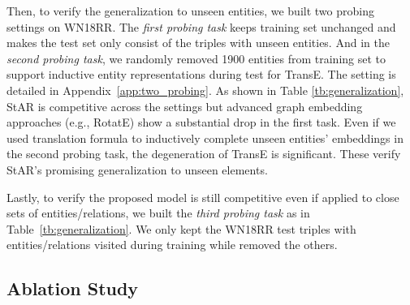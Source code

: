 \documentclass[sigconf]{acmart}
\begin{document}
Then, to verify the generalization to unseen entities, we built two probing settings on WN18RR. The \emph{first probing task} keeps training set unchanged and makes the test set only consist of the triples with unseen entities. And in the \emph{second probing task}, we randomly removed 1900 entities from training set to support inductive entity representations \citep{hamilton2017inductive} during test for TransE. The setting is detailed in Appendix~\ref{app:two_probing}. 
As shown in Table \ref{tb:generalization}, StAR is competitive across the settings but advanced graph embedding approaches (e.g., RotatE) show a substantial drop in the first task. Even if we used translation formula to inductively complete unseen entities' embeddings in the second probing task, the degeneration of TransE is significant. 
These verify StAR's promising generalization to unseen elements.

Lastly, to verify the proposed model is still competitive even if applied to close sets of entities/relations, we built the \textit{third probing task} as in Table~\ref{tb:generalization}. We only kept the WN18RR test triples with entities/relations visited during training while removed the others. 



\subsection{Ablation Study}  \label{subsec:ablation}
\end{document}
